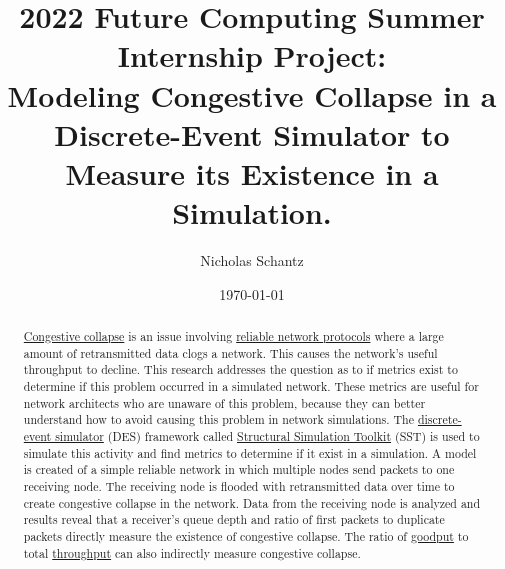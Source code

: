 \documentclass{article}
\begin{document}
    \begin{minipage}[h]{\textwidth}
        \title{2022 Future Computing Summer Internship Project:\\Modeling Congestive Collapse in a Discrete-Event Simulator to Measure its Existence in a Simulation.}
        \author{Nicholas Schantz}
        \date{\today}
            \maketitle
        \begin{abstract}
            \href{https://en.wikipedia.org/wiki/Network_congestion#Congestive_collapse}{Congestive collapse} is an issue involving \href{https://en.wikipedia.org/wiki/Reliability_(computer_networking}{reliable network protocols} where a large amount of retransmitted data clogs a network. This causes the network's useful throughput to decline. This research addresses the question as to if metrics exist to determine if this problem occurred in a simulated network. These metrics are useful for network architects who are unaware of this problem, because they can better understand how to avoid causing this problem in network simulations. The \href{https://en.wikipedia.org/wiki/Discrete-event_simulation}{discrete-event simulator} (DES) framework called \href{http://sst-simulator.org/}{Structural Simulation Toolkit} (SST) is used to simulate this activity and find metrics to determine if it exist in a simulation. A model is created of a simple reliable network in which multiple nodes send packets to one receiving node. The receiving node is flooded with retransmitted data over time to create congestive collapse in the network. Data from the receiving node is analyzed and results reveal that a receiver's queue depth and ratio of first packets to duplicate packets directly measure the existence of congestive collapse. The ratio of \href{https://en.wikipedia.org/wiki/Goodput}{goodput} to total \href{https://en.wikipedia.org/wiki/Network_throughput}{throughput} can also indirectly measure congestive collapse.
        \end{abstract}
    \end{minipage}

\ \\

\end{document}

